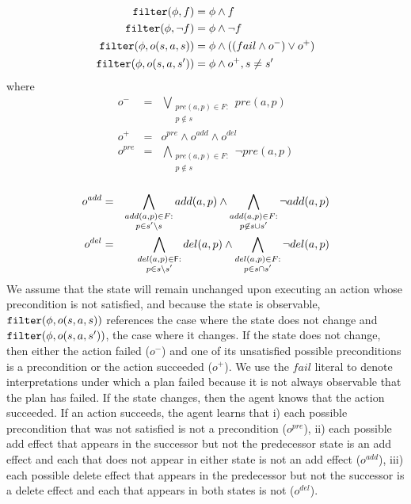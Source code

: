 \documentclass[letterpaper]{article}
\begin{document}
\begin{align*}
{\tt filter}(\phi, f) & = \phi \wedge f \\
{\tt filter}(\phi, \neg f) & = \phi \wedge \neg f \\
{\tt filter}(\phi, o(s, a, s)) & = \phi \wedge ((fail \wedge o^-) \vee  o^+)\\
{\tt filter}(\phi, o(s, a, s')) & = \phi \wedge  o^+, s \not= s'
\end{align*}
 where 
\begin{eqnarray*}
o^- &=& \bigvee\limits_{\substack{pre({a},p) \in 
F:\\ p \not\in s} } pre({a},p) 
\label{eqn:update1} \\
o^+ &=& o^{pre} \wedge o^{add} \wedge o^{del}\label{eqn:update2}\\
o^{pre} &=& \bigwedge\limits_{\substack{pre({a},p)
 \in F:\\ p \not\in s} }\neg pre({a},p)
 \label{eqn:update3}  \\
\end{eqnarray*}

\begin{eqnarray*}
o^{add} &=& \bigwedge\limits_{\substack{add({a},p) \in 
F:\\ p\in s'\backslash s} }add({a},p) 
  \wedge \bigwedge\limits_{\substack{add({a},p) \in 
  F: \\ p \not\in  s\cup s'}} \neg 
  add({a},p)   \label{eqn:update4}\\
o^{del} &=& 
\bigwedge\limits_{\substack{del({a},p) \in {\sf
F}: \\p \in s \backslash s'}}
del({a},p)  \wedge
\bigwedge\limits_{\substack{del({a},p)
\in F:\\ p \in s\cap s'}}\neg
del({a},p)  \label{eqn:update5}
\end{eqnarray*}
\noindent We assume that the state will remain unchanged upon executing
an action whose precondition is not satisfied, and because the
state is observable, ${\tt filter}(\phi, o(s, a, s))$ references the case where
the state does not change and ${\tt filter}(\phi, o(s, a, s'))$, the case where
it changes.  If the state does not change, then either the action failed
($o^-$) and one of its unsatisfied possible preconditions is a precondition  or
the action succeeded ($o^+$).  We use the $fail$ literal to denote
interpretations under which a plan failed because it is not always observable
that the plan has failed. If the state changes, then the agent knows that the
action succeeded. If an action  succeeds, the agent learns that i) each possible
precondition that was not satisfied is not a precondition ($o^{pre}$), ii) each possible add effect that appears in the successor but not the predecessor state is an add effect and each that does not appear in either state is not an add 
effect ($o^{add}$), iii) each possible delete effect that appears in the
predecessor but not the successor is a delete effect and each that  appears in both states is
not ($o^{del}$).
\end{document}
